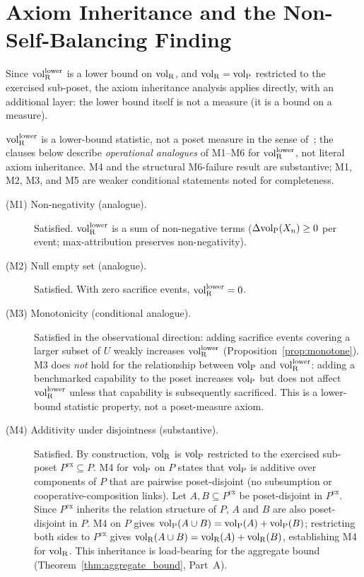 \section{Axiom Inheritance and the Non-Self-Balancing Finding}
\label{sec:axiom_inheritance}

Since ${\operatorname{vol}_{\mathrm{R}}^{\mathrm{lower}}}$ is a lower bound on ${\operatorname{vol}_{\mathrm{R}}}$, and ${\operatorname{vol}_{\mathrm{R}}} =
{\operatorname{vol}_{\mathrm{P}}}$ restricted to the exercised sub-poset, the axiom
inheritance analysis applies directly, with an additional layer:
the lower bound itself is not a measure (it is a bound on a
measure).

\begin{theorem}
\label{thm:axiom_inheritance}
${\operatorname{vol}_{\mathrm{R}}^{\mathrm{lower}}}$ is a lower-bound statistic, not a poset measure in
the sense of~\citep[Proposition~1]{lasser2026poset}; the clauses
below describe \emph{operational analogues} of M1--M6 for
${\operatorname{vol}_{\mathrm{R}}^{\mathrm{lower}}}$, not literal axiom inheritance.  M4 and the
structural M6-failure result are substantive; M1, M2, M3, and
M5 are weaker conditional statements noted for completeness.

\begin{description}
\item[(M1) Non-negativity (analogue).] Satisfied.  ${\operatorname{vol}_{\mathrm{R}}^{\mathrm{lower}}}$ is
  a sum of non-negative terms ($\Delta{\operatorname{vol}_{\mathrm{P}}}(X_n) \geq 0$ per event;
  max-attribution preserves non-negativity).

\item[(M2) Null empty set (analogue).] Satisfied.  With zero
  sacrifice events, ${\operatorname{vol}_{\mathrm{R}}^{\mathrm{lower}}} = 0$.

\item[(M3) Monotonicity (conditional analogue).] Satisfied in the
  observational direction: adding sacrifice events covering a
  larger subset of $U$ weakly increases ${\operatorname{vol}_{\mathrm{R}}^{\mathrm{lower}}}$
  (Proposition~\ref{prop:monotone}).  M3 does \emph{not} hold
  for the relationship between ${\operatorname{vol}_{\mathrm{P}}}$ and ${\operatorname{vol}_{\mathrm{R}}^{\mathrm{lower}}}$: adding
  a benchmarked capability to the poset increases ${\operatorname{vol}_{\mathrm{P}}}$ but
  does not affect ${\operatorname{vol}_{\mathrm{R}}^{\mathrm{lower}}}$ unless that capability is
  subsequently sacrificed.  This is a lower-bound statistic
  property, not a poset-measure axiom.

\item[(M4) Additivity under disjointness (substantive).]
  Satisfied.  By construction, ${\operatorname{vol}_{\mathrm{R}}}$ is ${\operatorname{vol}_{\mathrm{P}}}$ restricted
  to the exercised sub-poset $P^{\mathrm{ex}} \subseteq P$.  M4
  for ${\operatorname{vol}_{\mathrm{P}}}$ on $P$ states that ${\operatorname{vol}_{\mathrm{P}}}$ is additive over
  components of $P$ that are pairwise poset-disjoint (no
  subsumption or cooperative-composition links).  Let $A, B
  \subseteq P^{\mathrm{ex}}$ be poset-disjoint in $P^{\mathrm{ex}}$.
  Since $P^{\mathrm{ex}}$ inherits the relation structure of
  $P$, $A$ and $B$ are also poset-disjoint in $P$.  M4 on $P$
  gives ${\operatorname{vol}_{\mathrm{P}}}(A \cup B) = {\operatorname{vol}_{\mathrm{P}}}(A) + {\operatorname{vol}_{\mathrm{P}}}(B)$; restricting
  both sides to $P^{\mathrm{ex}}$ gives ${\operatorname{vol}_{\mathrm{R}}}(A \cup B) =
  {\operatorname{vol}_{\mathrm{R}}}(A) + {\operatorname{vol}_{\mathrm{R}}}(B)$, establishing M4 for ${\operatorname{vol}_{\mathrm{R}}}$.
  This inheritance is load-bearing for the aggregate bound
  (Theorem~\ref{thm:aggregate_bound}, Part~A).


\end{description}
\end{theorem}

